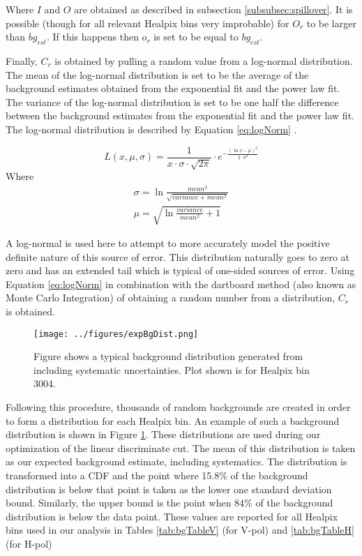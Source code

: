 Where $I$ and $O$ are obtained as described in subsection \ref{subsubsec:spillover}.  It is possible (though for all relevant Healpix bins very improbable) for $O_{r}$ to be larger than $bg_{est}$.  If this happens then $o_{r}$ is set to be equal to $bg_{est}$.
  
Finally, $C_{r}$ is obtained by pulling a random value from a log-normal distribution.  The mean of the log-normal distribution is set to be the average of the background estimates obtained from the exponential fit and the power law fit.  The variance of the log-normal distribution is set to be one half the difference between the background estimates from the exponential fit and the power law fit.   The log-normal distribution is described by Equation \ref{eq:logNorm} \cite{logNormal}.

\begin{equation} \label{eq:logNorm}
L(x,\mu,\sigma) = \frac{1}{x \cdot \sigma \cdot \sqrt{2\pi}} \cdot e^{-\frac{(\ln x-\mu)^2}{2 \cdot \sigma^2} }
\end{equation}
Where 
\begin{equation}
\begin{split}
 \sigma = \ln{ \frac{mean^2}{\sqrt{variance+mean^2}} }  \\
\mu = \sqrt{ \ln{ \frac{variance}{mean^2}+1 } } 
\end{split}
\end{equation}

A log-normal is used here to attempt to more accurately model the positive definite nature of this source of error.  This distribution naturally goes to zero at zero and has an extended tail which is typical of one-sided sources of error.  Using Equation \ref{eq:logNorm} in combination with the dartboard method (also known as Monte Carlo Integration) of obtaining a random number from a distribution,  $C_{r}$ is obtained.

\begin{figure}[h]
\centering
\texttt{[image: ../figures/expBgDist.png]}
\caption[Example Background Experiment Distribution]{Figure shows a typical background distribution generated from including systematic uncertainties.  Plot shown is for Healpix bin 3004.}
\label{fig:expBgDist}
\end{figure}

Following this procedure, thousands of random backgrounds are created in order to form a distribution for each Healpix bin.  An example of such a background distribution is shown in Figure \ref{fig:expBgDist}.  These distributions are used during our optimization of the linear discriminate cut.  The mean of this distribution is taken as our expected background estimate, including systematics.  The distribution is transformed into a CDF and the point where 15.8\% of the background distribution is below that point is taken as the lower one standard deviation bound.  Similarly, the upper bound is the point when 84\% of the background distribution is below the data point.  These values are reported for all Healpix bins used in our analysis in Tables \ref{tab:bgTableV} (for V-pol) and \ref{tab:bgTableH} (for H-pol)

